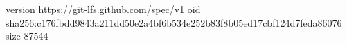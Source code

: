 version https://git-lfs.github.com/spec/v1
oid sha256:c176fbdd9843a211dd50e2a4bf6b534e252b83f8b05ed17cbf124d7feda86076
size 87544
